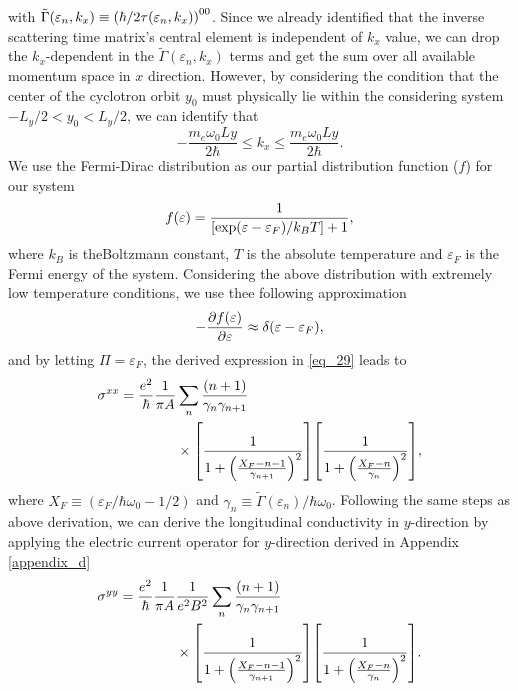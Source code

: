 with $\tilde{{\Gamma}}(\varepsilon_n,k_x) \equiv \qty({\hbar}/{2\tau(\varepsilon_n,k_x)})^{00}$. Since we already identified that the inverse scattering time matrix's central element is independent of $k_x$ value, we can drop the $k_x$-dependent in the $\tilde{{\Gamma}}(\varepsilon_n,k_x)$ terms and get the sum over all available momentum space in $x$ direction.
However, by considering the condition that the center of the cyclotron orbit $y_0$ must physically lie within the considering system $-L_y/2 < y_0 < L_y/2$, we can identify that
\begin{equation} \label{eq_30}
 -\frac{m_e\omega_0 Ly}{2\hbar} \leq k_x \leq \frac{m_e\omega_0 Ly}{2\hbar}.
\end{equation}
We use the Fermi-Dirac distribution as our partial distribution function ($f$) for our system
\begin{equation} \label{eq_31}
  f(\varepsilon) = \frac{1}{\qty[\exp(\varepsilon - \varepsilon_F)/k_B T]+1},
\end{equation}
where $k_B$ is theBoltzmann constant, $T$ is the absolute temperature and $\varepsilon_F$ is the Fermi energy of the system. Considering the above distribution with extremely low temperature conditions, we use thee following approximation
\begin{equation} \label{eq_32}
  - \pdv{f(\varepsilon)}{\varepsilon} \approx \delta(\varepsilon - \varepsilon_F),
\end{equation}
and by letting $\Pi = \varepsilon_F$, the derived expression in \ref{eq_29} leads to
\begin{equation} \label{eq_33}
  \begin{aligned}
    {\sigma}^{xx}  =
    \frac{e^2}{\hbar}
    \frac{1}{\pi A} &
    \sum_{n}
    \frac{\qty(n+1)}{\gamma_{n}\gamma_{n+1}} \\
    &\times
    \qty[
      \frac{1}
      {
        1 + \qty(\frac{X_F - n -1}{\gamma_{n+1}})^2
      }
    ]
    \qty[
      \frac{1}
      {
        1 + \qty(\frac{X_F - n}{\gamma_{n}})^2
      }
    ],
  \end{aligned}
\end{equation}
where $X_F \equiv ({\varepsilon_F}/{\hbar \omega_0} - {1}/{2})$
and
$\gamma_n \equiv {\tilde{{\Gamma}}(\varepsilon_n)}/{\hbar \omega_0}$.
Following the same steps as above derivation, we can derive the longitudinal conductivity in $y$-direction by applying the electric current operator for $y$-direction derived in Appendix \ref{appendix_d}
\begin{equation} \label{eq_34}
  \begin{aligned}
    {\sigma}^{yy} =
    \frac{e^2}{\hbar}
    \frac{1}{\pi A}&
    \frac{1}{e^2B^2}
    \sum_{n}
    \frac{\qty(n+1)}{\gamma_{n}\gamma_{n+1}} \\
    & \times
    \qty[
      \frac{1}
      {
        1 + \qty(\frac{X_F - n -1}{\gamma_{n+1}})^2
      }
    ]
    \qty[
      \frac{1}
      {
        1 + \qty(\frac{X_F - n}{\gamma_{n}})^2
      }
    ].
  \end{aligned}
\end{equation}
